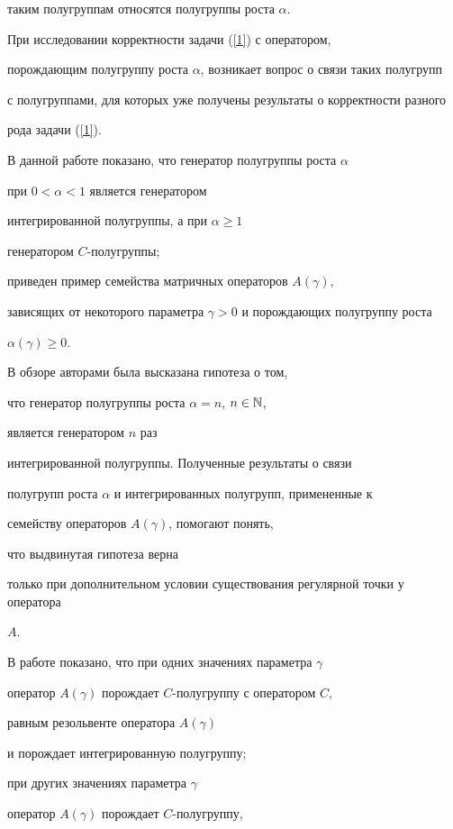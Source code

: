 таким полугруппам относятся полугруппы роста $\alpha$. 


При исследовании корректности задачи (\ref{1}) с оператором,


порождающим полугруппу роста $\alpha$, возникает вопрос о связи таких полугрупп


с полугруппами, для которых уже получены результаты о корректности разного 


рода задачи (\ref{1}).





В данной работе показано, что генератор полугруппы роста $\alpha$


при $0<\alpha<1$ является генератором 


интегрированной полугруппы, а при $\alpha\geq 1$


генератором $C$-полугруппы;


приведен пример семейства матричных операторов $A(\gamma)$,


зависящих от некоторого параметра $\gamma>0$ и порождающих полугруппу роста


$\alpha(\gamma)\geq 0$.





В обзоре \cite{Melnik} авторами была высказана гипотеза о том,


что генератор полугруппы роста $\alpha=n$, $n\in\Bbb N$,


является генератором $n$ раз


интегрированной полугруппы. Полученные результаты о связи


полугрупп роста $\alpha$ и интегрированных полугрупп, примененные к


семейству операторов $A(\gamma)$, помогают понять, 


что выдвинутая гипотеза верна


только при дополнительном условии существования регулярной точки у оператора


$A$.


В работе показано, что при одних значениях параметра $\gamma$


оператор $A(\gamma)$ порождает $C$-полугруппу с оператором $C$, 


равным резольвенте оператора $A(\gamma)$


и порождает интегрированную полугруппу;


при других значениях параметра $\gamma$


оператор $A(\gamma)$ порождает $C$-полугруппу,


